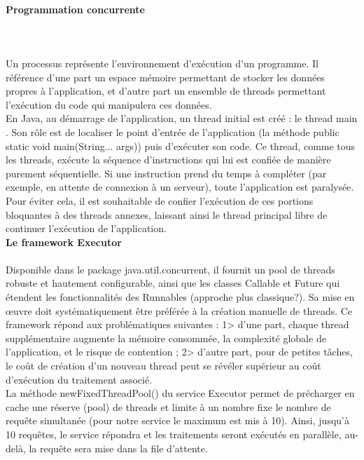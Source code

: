 \begin{itemize}
\paragraph{Programmation concurrente}\\ \label{Threads}
~\\

Un processus représente l'environnement d'exécution d'un programme. Il référence d'une part un espace mémoire permettant de stocker les données propres à l'application, et d'autre part un ensemble de threads permettant l'exécution du code qui manipulera ces données.\\

En Java, au démarrage de l'application, un thread initial est créé : le thread \og main \fg. Son rôle est de localiser le point d'entrée de l'application (la méthode public static void main(String... args)) puis d'exécuter son code.
Ce thread, comme tous les threads, exécute la séquence d'instructions qui lui est confiée de manière purement séquentielle. Si une instruction prend du temps à compléter (par exemple, en attente de connexion à un serveur), toute l'application est paralysée.
Pour éviter cela, il est souhaitable de confier l'exécution de ces portions bloquantes à des threads annexes, laissant ainsi le thread principal libre de continuer l'exécution de l'application.\\

\textbf{Le framework \og Executor \fg}\\
~\\
Disponible dans le package java.util.concurrent, il fournit un pool de threads robuste et hautement configurable, ainsi que les classes Callable et Future qui étendent les fonctionnalités des Runnables (approche plus classique?). Sa mise en œuvre doit systématiquement être préférée à la création manuelle de threads. Ce framework répond aux problématiques suivantes :
1> d'une part, chaque thread supplémentaire augmente la mémoire consommée, la complexité globale de l'application, et le risque de contention ;
2> d'autre part, pour de petites tâches, le coût de création d'un nouveau thread peut se révéler supérieur au coût d'exécution du traitement associé.\\

La méthode newFixedThreadPool() du service Executor permet de précharger en cache une réserve (pool) de threads et limite à un nombre fixe le nombre de requête simultanée (pour notre service le maximum est mis à 10). Ainsi, jusqu'à 10 requêtes, le service répondra et les traitements seront exécutés en parallèle, au-delà, la requête sera mise dans la file d'attente.\\


\end{itemize}
